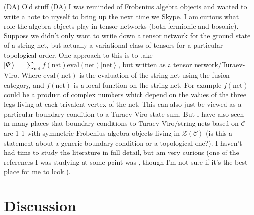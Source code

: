 \documentclass[12pt,a4paper]{article}
\newcommand{\mcz}{\mathcal{Z}}
\newcommand{\mcc}{\mathcal{C}}
\newcommand{\ket}[1]{\ensuremath{\left|#1\right\rangle}}
\newcommand{\dave}[1]{{\color{ao(english)}\footnotesize{(DA) #1}}}
\begin{document}
\dave{Old stuff}
\dave{
I was reminded of Frobenius algebra objects and wanted to write a note to myself to bring up the next time we Skype.
I am curious what role the algebra objects play in tensor networks (both fermionic and bosonic).
Suppose we didn't only want to write down a tensor network for the ground state of a string-net, 
but actually a variational class of tensors for a particular topological order.
One approach to this is to take $\ket{\Psi} = \sum_{\text{net}} f(\text{net}) \text{eval}(\text{net}) \ket{\text{net}}$, but written as a tensor network/Turaev-Viro. 
Where $\text{eval}(\text{net})$ is the evaluation of the string net using the fusion category, 
and $f(\text{net})$ is a local function on the string net.
For example $f(\text{net})$ could be a product of complex numbers which depend on the values of the three legs living at each trivalent vertex of the net. 
This can also just be viewed as a particular boundary condition to a Turaev-Viro state sum.
But I have also seen in many places that boundary conditions to Turaev-Viro/string-nets 
based on $\mcc$ are 1-1 with symmetric Frobenius algebra objects living in $\mcz(\mcc)$ (is this a statement about a generic boundary condition or a topological one?).
I haven't had time to study the literature in full detail, but am very curious 
(one of the references I was studying at some point was \cite{Schauenburg2001}, 
though I'm not sure if it's the best place for me to look.).
}

 
\section{Discussion} \label{discussion}
\end{document}
